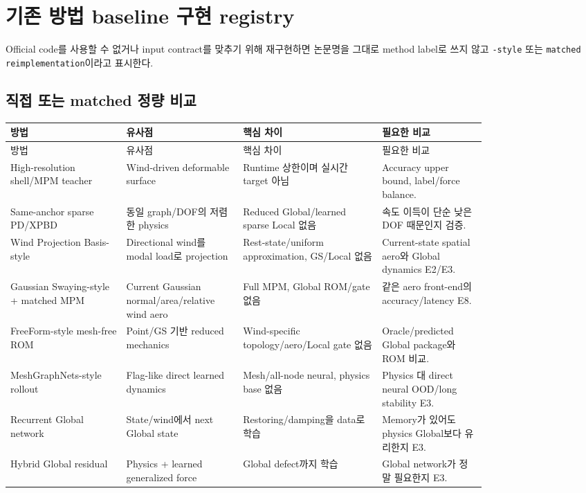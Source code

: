 \documentclass[10pt,a4paper]{article}
\newcommand{\code}[1]{\texttt{#1}}
\begin{document}
\section{기존 방법 baseline 구현 registry}

Official code를 사용할 수 없거나 input contract를 맞추기 위해 재구현하면 논문명을 그대로 method label로 쓰지 않고
\code{-style} 또는 \code{matched reimplementation}이라고 표시한다.

\subsection{직접 또는 matched 정량 비교}

\small
\begin{longtable}{L{0.20\linewidth}L{0.18\linewidth}L{0.24\linewidth}L{0.18\linewidth}}
\toprule
방법 & 유사점 & 핵심 차이 & 필요한 비교 \\
\midrule
\endfirsthead
\toprule
방법 & 유사점 & 핵심 차이 & 필요한 비교 \\
\midrule
\endhead
High-resolution shell/MPM teacher & Wind-driven deformable surface & Runtime 상한이며 실시간 target 아님 & Accuracy upper bound, label/force balance. \\
Same-anchor sparse PD/XPBD & 동일 graph/DOF의 저렴한 physics & Reduced Global/learned sparse Local 없음 & 속도 이득이 단순 낮은 DOF 때문인지 검증. \\
Wind Projection Basis-style & Directional wind를 modal load로 projection & Rest-state/uniform approximation, GS/Local 없음 & Current-state spatial aero와 Global dynamics E2/E3. \\
Gaussian Swaying-style + matched MPM & Current Gaussian normal/area/relative wind aero & Full MPM, Global ROM/gate 없음 & 같은 aero front-end의 accuracy/latency E8. \\
FreeForm-style mesh-free ROM & Point/GS 기반 reduced mechanics & Wind-specific topology/aero/Local gate 없음 & Oracle/predicted Global package와 ROM 비교. \\
MeshGraphNets-style rollout & Flag-like direct learned dynamics & Mesh/all-node neural, physics base 없음 & Physics 대 direct neural OOD/long stability E3. \\
Recurrent Global network & State/wind에서 next Global state & Restoring/damping을 data로 학습 & Memory가 있어도 physics Global보다 유리한지 E3. \\
Hybrid Global residual & Physics + learned generalized force & Global defect까지 학습 & Global network가 정말 필요한지 E3. \\

\end{longtable}
\end{document}
